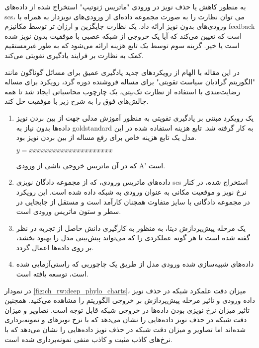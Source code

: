 به منظور کاهش یا حذف نویز در ورودی "ماتریس ژنوتیپ" استخراج شده از داده‌های \gls{scs}، می توان نظارت را به صورت مجموعه داده‌ای از ورودی‌های نویزدار به همراه با ورودی‌های بدون نویز ارائه داد. یک نظارت جایگزین و ارزان تر توسط مکانیزم \gls{feedback} است که تعیین می‌کند که آیا  یک خروجی  از شبکه عصبی با موفقیت بدون نویز شده است یا خیر. گزینه سوم توسط یک تابع هزینه ارائه می‌شود که به طور غیرمستقیم کمک به نظارت بر فرایند یادگیری تقویتی می‌کند. 

در این مقاله با الهام از رویکردهای جدید یادگیری عمیق  برای مسائل گوناگون مانند "الگوریتم گرادیان سیاست تقویتی" برای مساله فروشنده دوره گرد\cite{williams1992simple}،  رویکرد  \cite{selsam2018learning} برای مساله رضایت‌مندی با استفاده از نظارت تک‌بیتی، یک چارچوب محاسباتی ایجاد شد تا همه چالش‌های فوق را به شرح زیر با موفقیت حل کند.
\begin{enumerate}
	\item     یک رویکرد مبتنی بر یادگیری تقویتی به منظور آموزش مدلی جهت از بین بردن نویز داده‌ها بدون نیاز به \gls{goldstandard} به کار گرفته شد. تابع هزینه استفاده شده در این مدل یک تابع هزینه خاص برای رفع مساله از بین بردن نویز بود. 
    
    \begin{math}
    	y=xxxxxxxxxxxxxxxxxxxxx
    \end{math}

که در آن  ماتریس خروجی ناشی از ورودی A’ است. 
\item     داده‌های ماتریس ورودی، که از مجموعه دادگان نویزی \gls{scs} استخراج شده، در کنار نرخ نویز و موقعیت مکانی به عنوان ورودی به شبکه داده شده است.  این رویکرد در مجموعه دادگانی با سایز متفاوت همچنان کارآمد است و مستقل از جابجایی در سطر و ستون ماتریس ورودی است. 
\item یک مرحله پیش‌پردازش دیتا، به منظور به کارگیری دانش حاصل از تجربه در نظر گفته شده است تا هر گونه عملکردی را  که می‌تواند پیش‌بینی مدل را بهبود بخشد، بر روی داده‌ها اعمال گردد. 
\item داده‌های شبیه‌سازی شده ورودی مدل از طریق یک چاچوربی که راستی‌آزمایی شده است، توسعه یافته است. 
\end{enumerate}

در نمودار \ref{fig:ch_rw:deep_phylo_charts}، میزان دقت علمکرد شبکه در حذف نویز داده ورودی و تاثیر مرحله پیش‌پردازش بر خروجی الگوریتم را مشاهده می‌کنید. همچنین تاثیر میزان نرخ نویزی بودن داده‌ها در خروجی شبکه قابل توجه است. تصاویر  و  میزان دقت شبکه در حذف نویز داده‌هایی را نشان می‌دهد که با نزخ نویزهای   و  نمونه‌برداری شده‌اند اما  تصاویر  و  میزان دقت شبکه در حذف نویز داده‌هایی را نشان می‌دهد که با نرخ‌های کاذب مثبت  و کاذب منفی  نمونه‌برداری شده است.  


